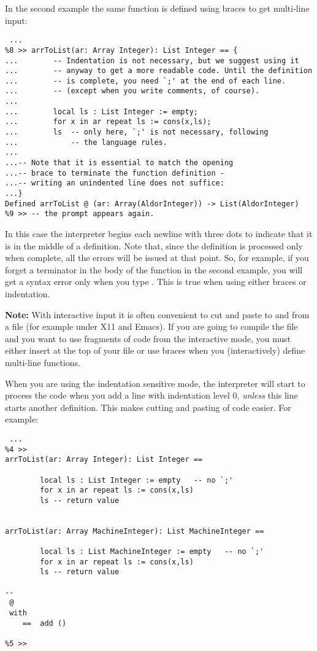 In the second example the same function is defined using braces to get
multi-line input:

{\small
\begin{verbatim}
 ...
%8 >> arrToList(ar: Array Integer): List Integer == {
...        -- Indentation is not necessary, but we suggest using it
...        -- anyway to get a more readable code. Until the definition 
...        -- is complete, you need `;' at the end of each line.
...        -- (except when you write comments, of course).
...
...        local ls : List Integer := empty;
...        for x in ar repeat ls := cons(x,ls);
...        ls  -- only here, `;' is not necessary, following 
...            -- the language rules.
...
...-- Note that it is essential to match the opening
...-- brace to terminate the function definition -
...-- writing an unindented line does not suffice:
...}
Defined arrToList @ (ar: Array(AldorInteger)) -> List(AldorInteger)
%9 >> -- the prompt appears again.
\end{verbatim}
}

In this case the interpreter begins each newline with three dots to
indicate that it is in the middle of a definition.
Note that, since the definition is processed only when complete, all
the errors will be issued at that point. So, for example, if you
forget a terminator in the body of the function in the second example,
you will get a syntax error only when you type \ttin{\}}. This is true
when using either braces or indentation.

{\bf Note:} With interactive input it is often convenient to cut and
paste to and from a file (for example under X11 and Emacs). If
you are going to compile the file and you want to use fragments of code
from the interactive mode, you must either insert  at the top
of your file or use braces when you (interactively) define multi-line
functions.

When you are using the indentation sensitive mode, the
interpreter will start to process the code when you add a line with
indentation level 0, {\em unless} this line starts another definition.
This makes cutting and pasting of code easier.
For example:

{\small
\begin{verbatim}
 ...
%4 >>
arrToList(ar: Array Integer): List Integer ==

        local ls : List Integer := empty   -- no `;'
        for x in ar repeat ls := cons(x,ls)
        ls -- return value


arrToList(ar: Array MachineInteger): List MachineInteger ==

        local ls : List MachineInteger := empty   -- no `;'
        for x in ar repeat ls := cons(x,ls)
        ls -- return value

--
 @ 
 with 
    ==  add ()

%5 >> 
\end{verbatim}
}


